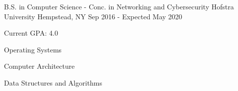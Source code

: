 

\begin{cventries}

  \cventry
    {B.S. in Computer Science - Conc. in Networking and Cybersecurity} %
    {Hofstra University} %
    {Hempstead, NY} %
    {Sep 2016 - Expected May 2020} %
    {
      \begin{cvitems} %
        \item {Current GPA: 4.0} 
        \item {Operating Systems}
        \item {Computer Architecture}
        \item {Data Structures and Algorithms}
      \end{cvitems}
    }

%
\end{cventries}
